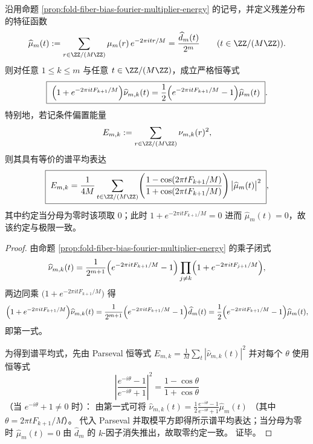 \begin{theorem}[条件偏置的频域运输恒等式与谱平均能量]\label{thm:fold-fiber-bias-frequency-transport-identity}
沿用命题 \ref{prop:fold-fiber-bias-fourier-multiplier-energy} 的记号，并定义残差分布的特征函数
\[
\widehat\mu_m(t):=\sum_{r\in\ZZ/(M\ZZ)}\mu_m(r)\,e^{-2\pi i tr/M}
=\frac{\widehat d_m(t)}{2^m}
\qquad (t\in\ZZ/(M\ZZ)).
\]
则对任意 \(1\le k\le m\) 与任意 \(t\in\ZZ/(M\ZZ)\)，成立严格恒等式
\[
\boxed{\;
\Bigl(1+e^{-2\pi i tF_{k+1}/M}\Bigr)\widehat\nu_{m,k}(t)
=\frac12\Bigl(e^{-2\pi i tF_{k+1}/M}-1\Bigr)\widehat\mu_m(t)\; }.
\]
特别地，若记条件偏置能量
\[
E_{m,k}:=\sum_{r\in\ZZ/(M\ZZ)}\nu_{m,k}(r)^2,
\]
则其具有等价的谱平均表达
\[
\boxed{\;
E_{m,k}
=\frac{1}{4M}\sum_{t\in\ZZ/(M\ZZ)}
\Biggl(\frac{1-\cos(2\pi tF_{k+1}/M)}{1+\cos(2\pi tF_{k+1}/M)}\Biggr)\,
\bigl|\widehat\mu_m(t)\bigr|^2\; } ,
\]
其中约定当分母为零时该项取 \(0\)；此时 \(1+e^{-2\pi i tF_{k+1}/M}=0\) 进而 \(\widehat\mu_m(t)=0\)，故该约定与极限一致。
\end{theorem}
\begin{proof}
由命题 \ref{prop:fold-fiber-bias-fourier-multiplier-energy} 的乘子闭式
\[
\widehat\nu_{m,k}(t)
=\frac{1}{2^{m+1}}\Bigl(e^{-2\pi i tF_{k+1}/M}-1\Bigr)
\prod_{j\ne k}\Bigl(1+e^{-2\pi i tF_{j+1}/M}\Bigr),
\]
两边同乘 \(\bigl(1+e^{-2\pi i tF_{k+1}/M}\bigr)\) 得
\[
\Bigl(1+e^{-2\pi i tF_{k+1}/M}\Bigr)\widehat\nu_{m,k}(t)
=\frac{1}{2^{m+1}}\Bigl(e^{-2\pi i tF_{k+1}/M}-1\Bigr)\widehat d_m(t)
=\frac12\Bigl(e^{-2\pi i tF_{k+1}/M}-1\Bigr)\widehat\mu_m(t),
\]
即第一式。
\par
为得到谱平均式，先由 Parseval 恒等式
\(
E_{m,k}=\frac1M\sum_t|\widehat\nu_{m,k}(t)|^2
\)
并对每个 \(\theta\) 使用恒等式
\[
\left|\frac{e^{-i\theta}-1}{e^{-i\theta}+1}\right|^2=\frac{1-\cos\theta}{1+\cos\theta}
\]
（当 \(e^{-i\theta}+1\neq 0\) 时）：
由第一式可将
\(
\widehat\nu_{m,k}(t)=\frac12\frac{e^{-i\theta}-1}{e^{-i\theta}+1}\widehat\mu_m(t)
\)
（其中 \(\theta=2\pi tF_{k+1}/M\)）。
代入 Parseval 并取模平方即得所示谱平均表达；当分母为零时 \(\widehat\mu_m(t)=0\) 由 \(\widehat d_m\) 的 \(k\)-因子消失推出，故取零约定一致。
证毕。
\end{proof}

